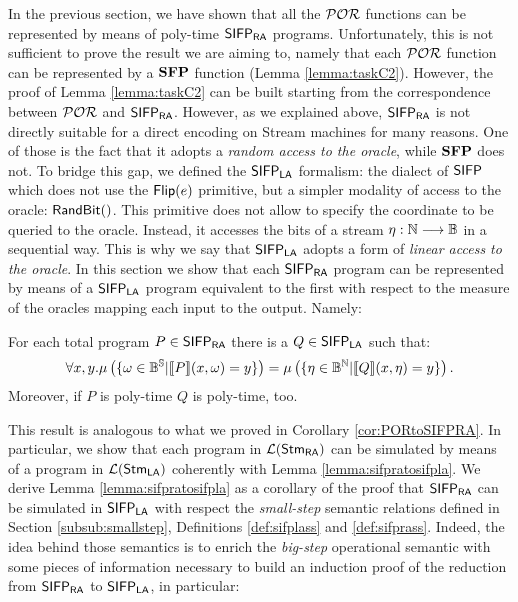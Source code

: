 In the previous section, we have shown that all the $\mathcal{POR}$ functions
can be represented by means of
poly-time $\mathsf{SIFP_{{\mathsf{RA}}}}$ programs. Unfortunately, this is not sufficient to prove the
result we are aiming to, namely that each $\mathcal{POR}$ function can be represented by
a $\mathbf{SFP}$ function (Lemma \ref{lemma:taskC2}). However, the proof of
Lemma \ref{lemma:taskC2} can be built starting from the correspondence between $\mathcal{POR}$
and $\mathsf{SIFP_{{\mathsf{RA}}}}$.
However, as we explained above, $\mathsf{SIFP_{{\mathsf{RA}}}}$ is not directly suitable
for a direct encoding on Stream machines for many reasons. One of those is the
fact that it adopts a \emph{random access to the oracle}, while $\mathbf{SFP}$ does not.
To bridge this gap, we defined the $\mathsf{SIFP_{{\mathsf{LA}}}}$ formalism: the dialect of
$\mathsf{SIFP}$ which does not use the $\mathsf{Flip(}e\mathsf{)}$ primitive, but
a simpler modality
of access to the oracle: $\mathsf{RandBit()}$. This primitive does not allow
to specify the coordinate to be queried to the oracle. Instead,
it accesses the bits of a stream $\eta : \mathbb{N} \longrightarrow \mathbb{B}$ in a sequential way.
This is why we say that $\mathsf{SIFP_{{\mathsf{LA}}}}$ adopts a form of \emph{linear access to the oracle}.
%
In this section we show that each $\mathsf{SIFP_{{\mathsf{RA}}}}$ program can be represented by means of a
$\mathsf{SIFP_{{\mathsf{LA}}}}$ program equivalent to the first with respect to
the measure of the oracles mapping each input to the output. Namely:

\begin{lemma}
  \label{lemma:sifpratosifpla}
  For each total program $P \in \mathsf{SIFP_{{\mathsf{RA}}}}$ there is a $Q \in \mathsf{SIFP_{{\mathsf{LA}}}}$ such that:
  $$
  \forall x, y. \mu\left(\{\omega \in \mathbb{B}^{\mathbb{S}}| \llbracket P\rrbracket (x, \omega)= y\}\right)=
                \mu\left(\{\eta \in \mathbb{B}^{\mathbb{N}}| \llbracket Q \rrbracket(x, \eta)= y\}\right).
  $$
  Moreover, if $P$ is poly-time $Q$ is poly-time, too.
\end{lemma}

This result is analogous to what we proved in Corollary \ref{cor:PORtoSIFPRA}.
%
In particular, we show that each program in ${\mathcal L ({\mathsf{Stm}_{\mathsf{RA}}})}$
can be simulated by means of a program in ${\mathcal L ({\mathsf{Stm}_{\mathsf{LA}}})}$
coherently with Lemma \ref{lemma:sifpratosifpla}.
%
We derive Lemma \ref{lemma:sifpratosifpla} as a corollary of the proof that
$\mathsf{SIFP_{{\mathsf{RA}}}}$ can be simulated in $\mathsf{SIFP_{{\mathsf{LA}}}}$ with respect the
\emph{small-step} semantic relations defined in Section \ref{subsub:smallstep},
Definitions \ref{def:sifplass} and \ref{def:sifprass}.
%
Indeed, the idea behind those semantics is to enrich the \emph{big-step} operational
semantic with some
pieces of information necessary to build an induction
proof of the reduction from $\mathsf{SIFP_{{\mathsf{RA}}}}$ to $\mathsf{SIFP_{{\mathsf{LA}}}}$, in particular:


